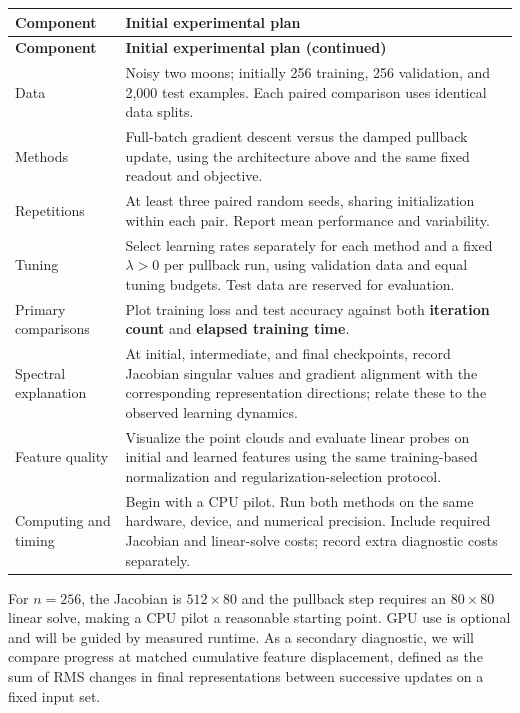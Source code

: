 \documentclass[11pt]{article}
\begin{document}
\begingroup
\small
\setlength{\LTpre}{0.25em}
\setlength{\LTpost}{0.25em}
\renewcommand{\arraystretch}{1.12}
\begin{longtable}{@{}>{\raggedright\arraybackslash}p{}
  >{\raggedright\arraybackslash}p{}@{}}
\toprule
\textbf{Component} & \textbf{Initial experimental plan}\\
\midrule
\endfirsthead
\toprule
\textbf{Component} & \textbf{Initial experimental plan (continued)}\\
\midrule
\endhead
\bottomrule
\endfoot
Data & Noisy two moons; initially 256 training, 256 validation, and 2,000
test examples. Each paired comparison uses identical data splits.\\
\addlinespace
Methods & Full-batch gradient descent versus the damped pullback update,
using the architecture above and the same fixed readout and objective.\\
\addlinespace
Repetitions & At least three paired random seeds, sharing initialization
within each pair. Report mean performance and variability.\\
\addlinespace
Tuning & Select learning rates separately for each method and a fixed
$\lambda>0$ per pullback run, using validation data and equal tuning budgets.
Test data are reserved for evaluation.\\
\addlinespace
Primary comparisons & Plot training loss and test accuracy against both
\textbf{iteration count} and \textbf{elapsed training time}.\\
\addlinespace
Spectral explanation & At initial, intermediate, and final checkpoints,
record Jacobian singular values and gradient alignment with the corresponding
representation directions; relate these to the observed learning dynamics.\\
\addlinespace
Feature quality & Visualize the point clouds and evaluate linear probes on
initial and learned features using the same training-based normalization
and regularization-selection protocol.\\
\addlinespace
Computing and timing & Begin with a CPU pilot. Run both methods on the same
hardware, device, and numerical precision. Include required Jacobian and
linear-solve costs; record extra diagnostic costs separately.\\
\end{longtable}
\endgroup

For $n=256$, the Jacobian is $512\times80$ and the pullback step requires
an $80\times80$ linear solve, making a CPU pilot a reasonable starting point.
GPU use is optional and will be guided by measured runtime. As a secondary
diagnostic, we will compare progress at matched cumulative feature displacement,
defined as the sum of RMS changes in final representations between successive
updates on a fixed input set.
\end{document}
